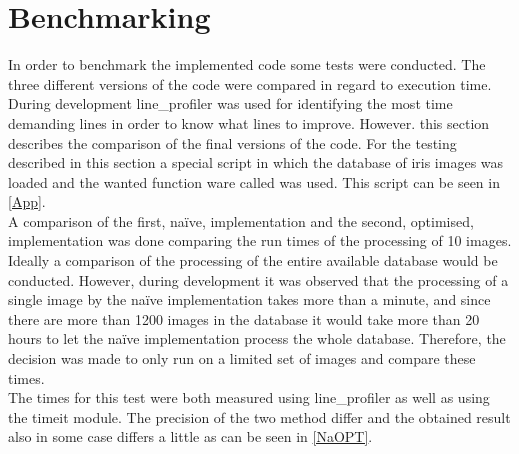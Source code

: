 \section{Benchmarking}
In order to benchmark the implemented code some tests were conducted. The three different versions of the code were compared in regard to execution time. During development line_profiler was used for identifying the most time demanding lines in order to know what lines to improve. However. this section describes the comparison of the final versions of the code. For the testing described in this section a special script in which the database of iris images was loaded and the wanted function ware called was used. This script can be seen in \autoref{App}. \\
A comparison of the first, na\"ive, implementation and the second, optimised, implementation was done comparing the run times of the processing of 10 images. Ideally a comparison of the processing of the entire available database would be conducted. However, during development it was observed that the processing of a single image by the na\"ive implementation takes more than a minute, and since there are more than 1200 images in the database it would take more than 20 hours to let the na\"ive implementation process the whole database. Therefore, the decision was made to only run on a limited set of images and compare these times. \\
The times for this test were both measured using line_profiler as well as using the timeit module. The precision of the two method differ and the obtained result also in some case differs a little as can be seen in \autoref{NaOPT}.  

